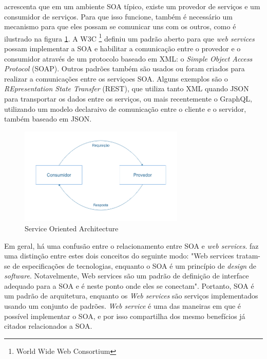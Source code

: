  acrescenta que em um ambiente SOA típico, existe um provedor de serviços e um consumidor de serviços. Para que isso funcione, também é necessário um mecanismo para que eles possam se comunicar uns com os outros, como é ilustrado na figura \ref{fig:soa}. A W3C \footnote{World Wide Web Consortium} definiu um padrão aberto para que \textit{web services} possam implementar a SOA e habilitar a comunicação entre o provedor e o consumidor através de um protocolo baseado em XML: o \textit{Simple Object Access Protocol} (SOAP). Outros padrões também são usados ou foram criados para realizar a comunicações entre os serviçoes SOA. Alguns exemplos são o \textit{REpresentation State Transfer} (REST), que utiliza tanto XML quando JSON para transportar os dados entre os serviços, ou mais recentemente o GraphQL, utilizando um modelo declaraivo de comunicação entre o cliente e o servidor, também baseado em JSON.

\begin{figure}[htbp]
    \centering
    \includegraphics[width=0.7\textwidth]{figuras/soa.png}
    \caption{Service Oriented Architecture}
    \label{fig:soa}
\end{figure}

Em geral, há uma confusão entre o relacionamento entre SOA e \textit{web services}.  faz uma distinção entre estes dois conceitos do seguinte modo: "Web services tratam-se de especificações de tecnologias, enquanto o SOA é um princípio de \textit{design} de \textit{software}. Notavelmente, Web services são um padrão de definição de interface adequado para a SOA e é neste ponto onde eles se conectam". Portanto, SOA é um padrão de arquitetura, enquanto os \textit{Web services} são serviços implementados usando um conjunto de padrões. \textit{Web service} é uma das maneiras em que é possível implementar o SOA, e por isso compartilha dos mesmo benefícios já citados relacionados a SOA.
